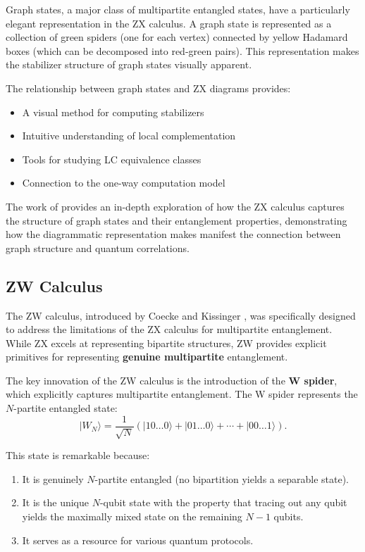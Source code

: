\documentclass[12pt,a4paper]{article}
\begin{document}
Graph states, a major class of multipartite entangled states, have a particularly elegant representation in the ZX calculus. A graph state is represented as a collection of green spiders (one for each vertex) connected by yellow Hadamard boxes (which can be decomposed into red-green pairs). This representation makes the stabilizer structure of graph states visually apparent.

The relationship between graph states and ZX diagrams provides:
\begin{itemize}
	\item A visual method for computing stabilizers
	\item Intuitive understanding of local complementation
	\item Tools for studying LC equivalence classes
	\item Connection to the one-way computation model
\end{itemize}

The work of \cite{categorical-quantum-mechanics} provides an in-depth exploration of how the ZX calculus captures the structure of graph states and their entanglement properties, demonstrating how the diagrammatic representation makes manifest the connection between graph structure and quantum correlations.

\subsection{ZW Calculus}
\label{sec:zw}

The ZW calculus, introduced by Coecke and Kissinger \cite{zw-calculus,zw-phd}, was specifically designed to address the limitations of the ZX calculus for multipartite entanglement. While ZX excels at representing bipartite structures, ZW provides explicit primitives for representing \textbf{genuine multipartite} entanglement.

The key innovation of the ZW calculus is the introduction of the \textbf{W spider}, which explicitly captures multipartite entanglement. The W spider represents the $N$-partite entangled state:
\begin{equation}
	|W_N\rangle = \frac{1}{\sqrt{N}}(|10\ldots 0\rangle + |01\ldots 0\rangle + \cdots + |00\ldots 1\rangle).
\end{equation}

This state is remarkable because:
\begin{enumerate}
	\item It is genuinely $N$-partite entangled (no bipartition yields a separable state).
	\item It is the unique $N$-qubit state with the property that tracing out any qubit yields the maximally mixed state on the remaining $N-1$ qubits.
	\item It serves as a resource for various quantum protocols.
\end{enumerate}
\end{document}
